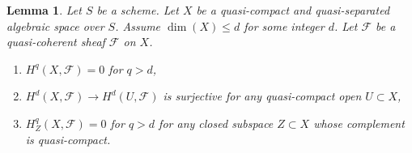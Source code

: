 \documentclass{stacks-project}
\theoremstyle{plain}
\newtheorem{lemma}[subsection]{Lemma}
\theoremstyle{definition}
\theoremstyle{remark}
\numberwithin{equation}{subsection}
\begin{document}
\begin{lemma}
\label{lemma-vanishing-above-dimension}
Let $S$ be a scheme. Let $X$ be a quasi-compact and quasi-separated
algebraic space over $S$. Assume $\dim(X) \leq d$ for some integer $d$.
Let $\mathcal{F}$ be a quasi-coherent sheaf $\mathcal{F}$ on $X$.
\begin{enumerate}
\item $H^q(X, \mathcal{F}) = 0$ for $q > d$,
\item $H^d(X, \mathcal{F}) \to H^d(U, \mathcal{F})$ is surjective
for any quasi-compact open $U \subset X$,
\item $H^q_Z(X, \mathcal{F}) = 0$ for $q > d$ for any closed subspace
$Z \subset X$ whose complement is quasi-compact.
\end{enumerate}
\end{lemma}
\end{document}
